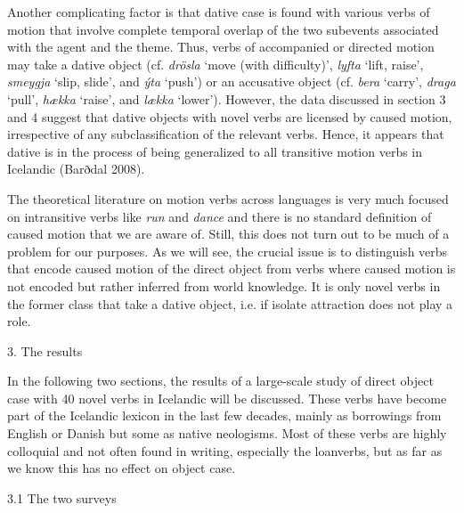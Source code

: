 \begin{styleStandard}
Another complicating factor is that dative case is found with various verbs of motion that involve complete temporal overlap of the two subevents associated with the agent and the theme. Thus, verbs of accompanied or directed motion may take a dative object (cf. \textit{drösla} ‘move (with difficulty)’, \textit{lyfta} ‘lift, raise’, \textit{smeygja} ‘slip, slide’, and \textit{ýta} ‘push’) or an accusative object (cf. \textit{bera} ‘carry’, \textit{draga} ‘pull’, \textit{hækka} ‘raise’, and \textit{lækka} ‘lower’). However, the data discussed in section 3 and 4 suggest that dative objects with novel verbs are licensed by caused motion, irrespective of any subclassification of the relevant verbs. Hence, it appears that dative is in the process of being generalized to all transitive motion verbs in Icelandic (Barðdal 2008).
\end{styleStandard}

\begin{styleStandard}
The theoretical literature on motion verbs across languages is very much focused on intransitive verbs like \textit{run} and \textit{dance} and there is no standard definition of caused motion that we are aware of. Still, this does not turn out to be much of a problem for our purposes. As we will see, the crucial issue is to distinguish verbs that encode caused motion of the direct object from verbs where caused motion is not encoded but rather inferred from world knowledge. It is only novel verbs in the former class that take a dative object, i.e. if isolate attraction does not play a role.
\end{styleStandard}

\begin{stylelsSectioni}
3. The results
\end{stylelsSectioni}

\begin{styleStandard}
In the following two sections, the results of a large-scale study of direct object case with 40 novel verbs in Icelandic will be discussed. These verbs have become part of the Icelandic lexicon in the last few decades, mainly as borrowings from English or Danish but some as native neologisms. Most of these verbs are highly colloquial and not often found in writing, especially the loanverbs, but as far as we know this has no effect on object case. 
\end{styleStandard}

\begin{stylelsSectionii}
3.1 The two surveys
\end{stylelsSectionii}

